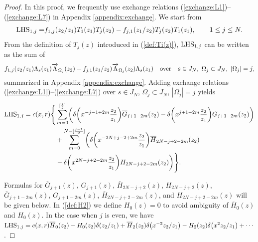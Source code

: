 \documentclass[10pt,a4paper]{amsart}
\numberwithin{equation}{section}
\begin{document}
\begin{proof}
{In this proof, we frequently use exchange relations
(\ref{exchange:L1})--(\ref{exchange:L7}) in Appendix \ref{appendix:exchange}.}
We start from
\begin{gather*}
{{\rm LHS}_{1,j}=}f_{1,j}(z_2/z_1)T_1(z_1)T_j(z_2)-f_{j,1}(z_1/z_2)T_j(z_2)T_1(z_1),\qquad
1\leq j \leq N.
\end{gather*}
From the definition of $T_j(z)$ introduced in (\ref{def:Ti(z)}),
${\rm LHS}_{1,j}$ can be written {as} the sum of
\begin{gather*}
f_{1,j}(z_2/z_1)\Lambda_s(z_1)
\overrightarrow{\Lambda}_{\Omega_j}(z_2)-f_{j,1}(z_1/z_2)
\overrightarrow{\Lambda}_{\Omega_j}(z_2)\Lambda_s(z_1)\quad
{\rm over}\quad
s \in J_N,\  \Omega_j \subset J_N,\  |\Omega_j|=j,
\end{gather*}
summarized in Appendix \ref{appendix:exchange}.
Adding exchange relations (\ref{exchange:L1})--(\ref{exchange:L7})
over $s \in J_N$, $\Omega_j \subset J_N$, $|\Omega_j|=j$ yields
\begin{align}
{\rm LHS}_{1,j}={}c(x,r)
\Biggl\{&\sum_{m=0}^{[\frac{j}{2}]}
\biggl(\delta\biggl(x^{-j-1+2m}\frac{z_2}{z_1}\biggr){\overline{G}_{j+1-2m}(z_2)}
-\delta\biggl(x^{j+1-2m}\frac{z_2}{z_1}\biggr){{G}_{j+1-2m}(z_2)}\biggr)\notag
\\
&+\sum_{m=0}^{N-[\frac{j-1}{2}]}
\biggl(\delta\biggl(x^{-2N+j-2+2m}\frac{z_2}{z_1}\biggr)
{\overline{H}_{2N-j+2-2m}(z_2)}\notag
\\
&-\delta\biggl(x^{2N-j+2-2m}\frac{z_2}{z_1}\biggr)
{H_{2N-j+2-2m}(z_2)}
\biggr)\Biggr\}.
\label{eqn:L1j-2}
\end{align}
{\sloppy
Formulas for $\overline{G}_{j+1}(z)$, $G_{j+1}(z)$, $\overline{H}_{2N-j+2}(z)$, $H_{2N-j+2}(z)$,
$\overline{G}_{j+1-2m}(z)$, $G_{j+1-2m}(z)$, $\overline{H}_{2N-j+2-2m}(z)$, and $H_{2N-j+2-2m}(z)$
will be given below. In (\ref{def:H2}) we define $H_0(z)=0$ to avoid ambiguity of
$\overline{H}_0(z)$ and $H_0(z)$. In the case when $j$ {is} even, we have
${\rm LHS}_{1,j}=c(x,r)\overline{H}_0(z_2)-H_0(z_2)\delta(z_2/z_1)+
\overline{H}_2(z_2)\delta\big(x^{-2}z_2/z_1\big)-H_2(z_2)\delta\big(x^2z_2/z_1\big)+\cdots$.

}


\end{proof}
\end{document}
